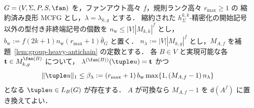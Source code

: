 \begin{lemma}[局所群型を指定した短いタプル]
\label{lem:local-group-shortest}
$G=(V,\Sigma,P,S,\fan)$ を，ファンアウト高々 $f$，規則ランク高々 $r_{\max}\ge1$ の
縮約済み良形 MCFG とし，$\lambda=\lambda_{k,g}$ とする．
縮約された $h^{k,k}_\Sigma$-精密化の開始記号以外の型付き非終端記号の個数を
$n_{\mathrm w}\le|V||M_{k,k}|^f$ とし，
$b_{\mathrm w}:=f(2k+1)n_{\mathrm w}(r_{\max}+1)\bar\theta_G$ と置く．
$n_\lambda:=|V||M_{k,g}|^f$ とし，$M_{A,f}$ を補題~\ref{lem:group-heavy-antichain} の定数とする．
各 $B\in V$ と実現可能な各 $\mathbf t\in M_{k,g}^{\fan(B)}$ について，
$\lambda^{(\fan(B))}(\tuple u)=\mathbf t$ かつ
\[
 \|\tuple u\|_1\le\beta_\lambda:=(r_{\max}+1)\,b_{\mathrm w}
 \max\{1,(M_{A,f}-1)\,n_\lambda\}
\]
となる $\tuple u\in L_B(G)$ が存在する．
$A$ が可換なら $M_{A,f}-1$ を $\mathsf d(A^f)$ に置き換えてよい．
\end{lemma}

